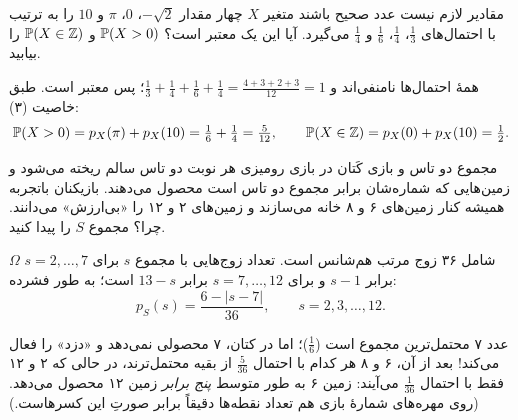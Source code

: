 \begin{example}[label=ex:weird-pmf]{مقادیر لازم نیست عدد صحیح باشند}
متغیر $X$ چهار مقدار $-\sqrt2$، $0$، $\pi$ و $10$ را به ترتیب با احتمال‌های $\tfrac13$، $\tfrac14$، $\tfrac16$ و $\tfrac14$ می‌گیرد. آیا این یک  معتبر است؟ $\P(X>0)$ و $\P(X\in\Z)$ را بیابید.
\begin{solution}
همهٔ احتمال‌ها نامنفی‌اند و $\tfrac13+\tfrac14+\tfrac16+\tfrac14=\tfrac{4+3+2+3}{12}=1$؛ پس معتبر است. طبق خاصیت (۳):
\[ \P(X>0)=p_X(\pi)+p_X(10)=\tfrac16+\tfrac14=\tfrac5{12},\qquad \P(X\in\Z)=p_X(0)+p_X(10)=\tfrac12. \]
\begin{center}
\end{center}
\end{solution}
\end{example}

\begin{example}[label=ex:catan]{مجموع دو تاس و بازی کَتان}
در بازی رومیزی  هر نوبت دو تاس سالم ریخته می‌شود و زمین‌هایی که شماره‌شان برابر مجموع دو تاس است محصول می‌دهند. بازیکنان باتجربه همیشه کنار زمین‌های ۶ و ۸ خانه می‌سازند و زمین‌های ۲ و ۱۲ را «بی‌ارزش» می‌دانند. چرا؟  مجموع $S$ را پیدا کنید.
\begin{solution}
$\Omega$ شامل ۳۶ زوج مرتب هم‌شانس است. تعداد زوج‌هایی با مجموع $s$ برای $s=2,\dots,7$ برابر $s-1$ و برای $s=7,\dots,12$ برابر $13-s$ است؛ به طور فشرده:
\[ p_S(s)=\frac{6-|s-7|}{36},\qquad s=2,3,\dots,12. \]
\begin{center}
\end{center}
عدد ۷ محتمل‌ترین مجموع است ($\tfrac16$)؛ اما در کتان، ۷ محصولی نمی‌دهد و «دزد» را فعال می‌کند! بعد از آن، ۶ و ۸ هر کدام با احتمال $\tfrac5{36}$ از بقیه محتمل‌ترند، در حالی که ۲ و ۱۲ فقط با احتمال $\tfrac1{36}$ می‌آیند: زمین ۶ به طور متوسط \emph{پنج برابر} زمین ۱۲ محصول می‌دهد. (روی مهره‌های شمارهٔ بازی هم تعداد نقطه‌ها دقیقاً برابر صورتِ این کسرهاست.)
\end{solution}
\end{example}

